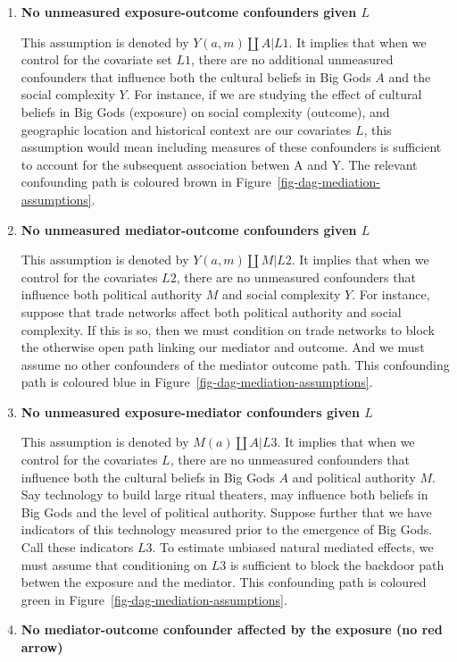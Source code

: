 \documentclass[
  singlecolumn]{report}
\begin{document}
\begin{enumerate}
\def\labelenumi{\arabic{enumi}.}
\item
  \textbf{No unmeasured exposure-outcome confounders given \(L\)}

  This assumption is denoted by \(Y(a,m) \coprod A | L1\). It implies
  that when we control for the covariate set \(L1\), there are no
  additional unmeasured confounders that influence both the cultural
  beliefs in Big Gods \(A\) and the social complexity \(Y\). For
  instance, if we are studying the effect of cultural beliefs in Big
  Gods (exposure) on social complexity (outcome), and geographic
  location and historical context are our covariates \(L\), this
  assumption would mean including measures of these confounders is
  sufficient to account for the subsequent association betwen A and Y.
  The relevant confounding path is coloured brown in
  Figure~\ref{fig-dag-mediation-assumptions}.
\item
  \textbf{No unmeasured mediator-outcome confounders given \(L\)}

  This assumption is denoted by \(Y(a,m) \coprod M | L2\). It implies
  that when we control for the covariates \(L2\), there are no
  unmeasured confounders that influence both political authority \(M\)
  and social complexity \(Y\). For instance, suppose that trade networks
  affect both political authority and social complexity. If this is so,
  then we must condition on trade networks to block the otherwise open
  path linking our mediator and outcome. And we must assume no other
  confounders of the mediator outcome path. This confounding path is
  coloured blue in Figure~\ref{fig-dag-mediation-assumptions}.
\item
  \textbf{No unmeasured exposure-mediator confounders given \(L\)}

  This assumption is denoted by \(M(a) \coprod A | L3\). It implies that
  when we control for the covariates \(L\), there are no unmeasured
  confounders that influence both the cultural beliefs in Big Gods \(A\)
  and political authority \(M\). Say technology to build large ritual
  theaters, may influence both beliefs in Big Gods and the level of
  political authority. Suppose further that we have indicators of this
  technology measured prior to the emergence of Big Gods. Call these
  indicators \(L3\). To estimate unbiased natural mediated effects, we
  must assume that conditioning on \(L3\) is sufficient to block the
  backdoor path betwen the exposure and the mediator. This confounding
  path is coloured green in Figure~\ref{fig-dag-mediation-assumptions}.
\item
  \textbf{No mediator-outcome confounder affected by the exposure (no
  red arrow)}
\end{enumerate}
\end{document}
